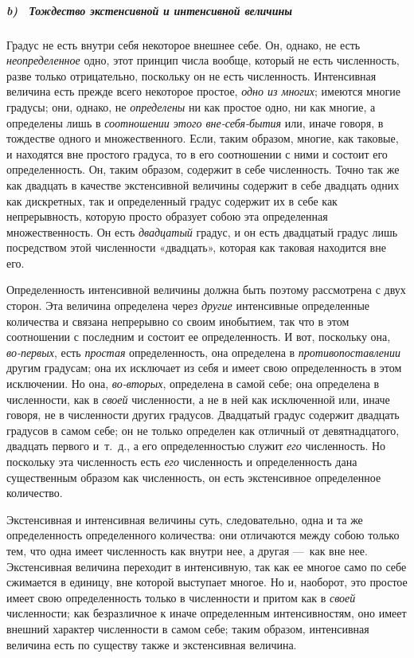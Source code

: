 {\subparagraph[b) \ Тождество экстенсивной и интенсивной величины]{b)
\ Тождество экстенсивной и интенсивной величины}
Градус не есть внутри себя некоторое внешнее себе. Он, однако, не есть
{\em неопределенное} одно, этот принцип числа вообще,
который не есть численность, разве только отрицательно, поскольку он не
есть численность. Интенсивная величина есть прежде всего некоторое простое,
{\em одно из многих}; имеются многие градусы; они,
однако, не {\em определены} ни как простое одно, ни как
многие, а определены лишь в {\em соотношении этого
вне-себя-бытия} или, иначе говоря, в тождестве одного и множественного.
Если, таким образом, многие, как таковые, и находятся вне простого градуса,
то в его соотношении с ними и состоит его определенность. Он, таким
образом, содержит в себе численность. Точно так же как двадцать в качестве
экстенсивной величины содержит в себе двадцать одних как дискретных, так и
определенный градус содержит их в себе как непрерывность, которую просто
образует собою эта определенная множественность. Он есть
{\em двадцатый} градус, и он есть двадцатый градус лишь
посредством этой численности «двадцать», которая как таковая находится вне
его.

Определенность интенсивной величины должна быть поэтому рассмотрена с двух
сторон. Эта величина определена через {\em другие}
интенсивные определенные количества и связана непрерывно со своим
инобытием, так что в этом соотношении с последним и состоит ее
определенность. И вот, поскольку она, {\em во-первых},
есть {\em простая} определенность, она определена в
{\em противопоставлении} другим градусам; она их
исключает из себя и имеет свою определенность в этом исключении. Но она,
{\em во-вторых}, определена в самой себе; она
определена в численности, как в {\em своей}
численности, а не в ней как исключенной или, иначе говоря, не в численности
других градусов. Двадцатый градус содержит двадцать градусов в самом себе;
он не только определен как отличный от девятнадцатого, двадцать первого
и~т.~д., а его определенностью служит {\em его}
численность. Но поскольку эта численность есть
{\em его} численность и определенность дана
существенным образом как численность, он есть экстенсивное определенное
количество.

Экстенсивная и интенсивная величины суть, следовательно, одна и та же
определенность определенного количества: они отличаются между собою только
тем, что одна имеет численность как внутри нее, а другая —~как вне нее.
Экстенсивная величина переходит в интенсивную, так как ее многое само по
себе сжимается в единицу, вне которой выступает многое. Но и, наоборот, это
простое имеет свою определенность только в численности и притом как в
{\em своей} численности; как безразличное к иначе
определенным интенсивностям, оно имеет внешний характер численности в самом
себе; таким образом, интенсивная величина есть по существу также и
экстенсивная величина.

}
